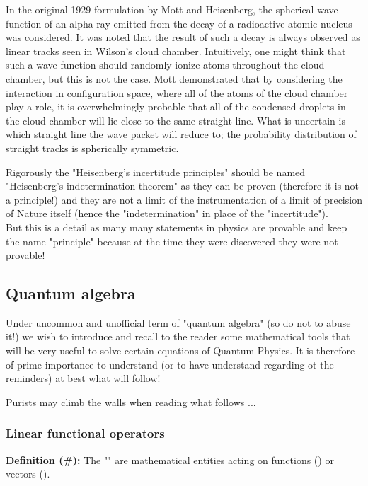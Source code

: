 	In the original 1929 formulation by Mott and Heisenberg, the spherical wave function of an alpha ray emitted from the decay of a radioactive atomic nucleus was considered. It was noted that the result of such a decay is always observed as linear tracks seen in Wilson's cloud chamber. Intuitively, one might think that such a wave function should randomly ionize atoms throughout the cloud chamber, but this is not the case. Mott demonstrated that by considering the interaction in configuration space, where all of the atoms of the cloud chamber play a role, it is overwhelmingly probable that all of the condensed droplets in the cloud chamber will lie close to the same straight line. What is uncertain is which straight line the wave packet will reduce to; the probability distribution of straight tracks is spherically symmetric. 
	\begin{tcolorbox}[title=Remark,colframe=black,arc=10pt]
	Rigorously the "Heisenberg's incertitude principles" should be named "Heisenberg's indetermination theorem" as they can be proven (therefore it is not a principle!) and they are not a limit of the instrumentation of a limit of precision of Nature itself (hence the "indetermination" in place of the "incertitude").\\
	
	But this is a detail as many many statements in physics are provable  and keep the name "principle" because at the time they were discovered they were not provable!
	\end{tcolorbox}

	\pagebreak
	\subsection{Quantum algebra}
	Under uncommon and unofficial term of "quantum algebra" (so do not to abuse it!) we wish to introduce and recall to the reader some mathematical tools  that will be very useful to solve certain equations of Quantum Physics. It is therefore of prime importance to understand (or to have understand  regarding ot the reminders) at best what will follow!
	
	\begin{tcolorbox}[title=Remark,colframe=black,arc=10pt]
	Purists may climb the walls when reading what follows ...
	\end{tcolorbox}
	
	\subsubsection{Linear functional operators}
	\textbf{Definition (\#\mydef):} The "" are mathematical entities acting on functions () or vectors ().

